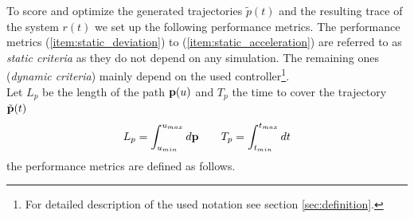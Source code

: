 To score and optimize the generated trajectories $\tilde{p}(t)$ and the resulting trace of the system $r(t)$ we set up the following performance metrics. The performance metrics (\ref{item:static_deviation}) to (\ref{item:static_acceleration}) are referred to as \textit{static criteria} as they do not depend on any simulation. The remaining ones (\textit{dynamic criteria}) mainly depend on the used controller\footnote{For detailed description of the used notation see section \ref{sec:definition}.}.
\\
Let $L_p$ be the length of the path ${\bf p}(u)$ and $T_p$ the time to cover the trajectory $\tilde{\bf p}(t)$
\begin{equation}
L_p = \int_{u_{min}}^{u_{max}} d{\bf p} \qquad T_p = \int_{t_{min}}^{t_{max}} dt
\label{eq:length_of_path}
\end{equation}
the performance metrics are defined as follows.

